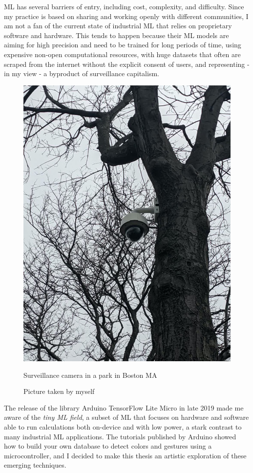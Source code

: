\acrshort{ML} has several barriers of entry, including cost, complexity, and difficulty. Since my practice is based on sharing and working openly with different communities, I am not a fan of the current state of industrial \acrshort{ML} that relies on proprietary software and hardware. This tends to happen because their ML models are aiming for high precision and need to be trained for long periods of time, using expensive non-open computational resources, with huge datasets that often are scraped from the internet without the explicit consent of users, and representing - in my view - a byproduct of surveillance capitalism.

\begin{figure}[ht]
  \centering
  \includegraphics[width=0.75\linewidth,height=0.30\textheight,keepaspectratio]{images/surveillance-camera-tree.jpg}
  \caption{Surveillance camera in a park in Boston MA}
  \caption*{Picture taken by myself}
  \label{fig:surveillance-camera-tree}
\end{figure}

The release of the library Arduino TensorFlow Lite Micro in late 2019 \cite{google-tensorflow-lite-micro-arduino} made me aware of the \emph{tiny \acrshort{ML} field}, a subset of \acrshort{ML} that focuses on hardware and software able to run calculations both on-device and with low power, a stark contrast to many industrial \acrshort{ML} applications. The tutorials published by Arduino \cite{arduino-tensorflow-fruit-identification} showed how to build your own database to detect colors and gestures using a microcontroller, and I decided to make this thesis an artistic exploration of these emerging techniques.

